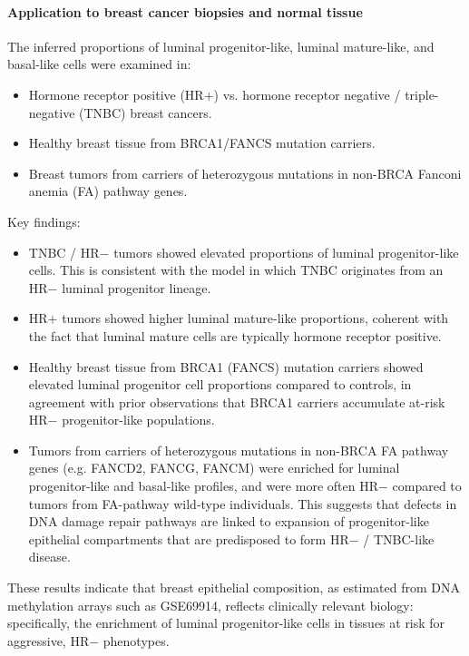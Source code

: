 \documentclass[10pt]{extarticle}
\begin{document}
\paragraph{Application to breast cancer biopsies and normal tissue}
The inferred proportions of luminal progenitor-like, luminal mature-like, and basal-like cells were examined in:
\begin{itemize}[label=-]
    \item Hormone receptor positive (HR$+$) vs. hormone receptor negative / triple-negative (TNBC) breast cancers.
    \item Healthy breast tissue from BRCA1/FANCS mutation carriers.
    \item Breast tumors from carriers of heterozygous mutations in non-BRCA Fanconi anemia (FA) pathway genes.
\end{itemize}
Key findings:
\begin{itemize}[label=-]
    \item TNBC / HR$-$ tumors showed elevated proportions of luminal progenitor-like cells. This is consistent with the model in which TNBC originates from an HR$-$ luminal progenitor lineage.
    \item HR$+$ tumors showed higher luminal mature-like proportions, coherent with the fact that luminal mature cells are typically hormone receptor positive.
    \item Healthy breast tissue from BRCA1 (FANCS) mutation carriers showed elevated luminal progenitor cell proportions compared to controls, in agreement with prior observations that BRCA1 carriers accumulate at-risk HR$-$ progenitor-like populations.
    \item Tumors from carriers of heterozygous mutations in non-BRCA FA pathway genes (e.g. FANCD2, FANCG, FANCM) were enriched for luminal progenitor-like and basal-like profiles, and were more often HR$-$ compared to tumors from FA-pathway wild-type individuals. This suggests that defects in DNA damage repair pathways are linked to expansion of progenitor-like epithelial compartments that are predisposed to form HR$-$ / TNBC-like disease.
\end{itemize}
These results indicate that breast epithelial composition, as estimated from DNA methylation arrays such as GSE69914, reflects clinically relevant biology: specifically, the enrichment of luminal progenitor-like cells in tissues at risk for aggressive, HR$-$ phenotypes.
\end{document}
